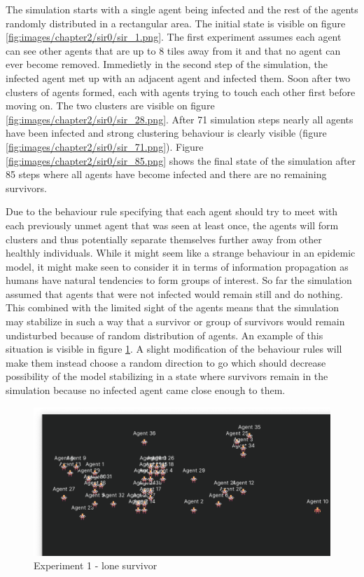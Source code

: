 The simulation starts with a single agent being infected and the rest of the agents randomly distributed in a rectangular area.
The initial state is visible on figure \ref{fig:images/chapter2/sir0/sir_1.png}.
The first experiment assumes each agent can see other agents that are up to 8 tiles away from it and that no agent can ever become removed.
Immedietly in the second step of the simulation, the infected agent met up with an adjacent agent and infected them.
Soon after two clusters of agents formed, each with agents trying to touch each other first before moving on.
The two clusters are visible on figure \ref{fig:images/chapter2/sir0/sir_28.png}.
After 71 simulation steps nearly all agents have been infected and strong clustering behaviour is clearly visible (figure \ref{fig:images/chapter2/sir0/sir_71.png}).
Figure \ref{fig:images/chapter2/sir0/sir_85.png} shows the final state of the simulation after 85 steps where all agents have become infected and there are no remaining survivors.

Due to the behaviour rule specifying that each agent should try to meet with each previously unmet agent that was seen at least once, the agents will form clusters and thus potentially separate themselves further away from other healthly individuals.
While it might seem like a strange behaviour in an epidemic model, it might make seen to consider it in terms of information propagation as humans have natural tendencies to form groups of interest.
So far the simulation assumed that agents that were not infected would remain still and do nothing.
This combined with the limited sight of the agents means that the simulation may stabilize in such a way that a survivor or group of survivors would remain undisturbed because of random distribution of agents.
An example of this situation is visible in figure \ref{fig:images/chapter2/sir0/sir_255.png}.
A slight modification of the behaviour rules will make them instead choose a random direction to go which should decrease possibility of the model stabilizing in a state where survivors remain in the simulation because no infected agent came close enough to them.

\begin{figure}[h]
    \centering
    \includegraphics[width=1.0\textwidth]{images/chapter2/sir0/sir_255.png}
    \caption{Experiment 1 - lone survivor}\label{fig:images/chapter2/sir0/sir_255.png}
\end{figure}

